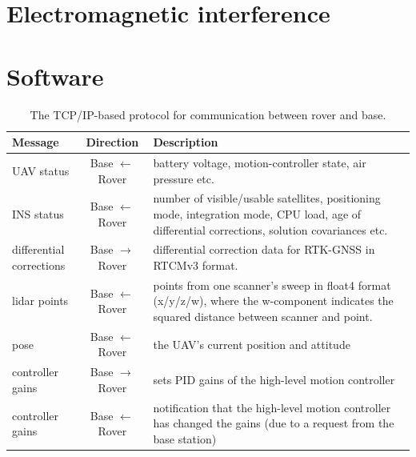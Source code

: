 \section{Electromagnetic interference}
\label{section_experimental_platform_hardware_interference}



\section{Software}
\label{section_experimental_platform_software}

\begin{table}
\caption{The TCP/IP-based protocol for communication between rover and base.}
\label{table_protocol}
\begin{center}
\begin{tabular}{l c l}
  \textbf{Message} & \textbf{Direction} & \textbf{Description} \\ \hline
  \parbox[t]{3cm}{UAV status} & Base $\leftarrow$ Rover & \parbox[t]{9cm}{battery voltage, motion-controller state, air pressure etc.\\} \\
  \parbox[t]{3cm}{INS status} & Base $\leftarrow$ Rover & \parbox[t]{9cm}{number of visible/usable satellites, positioning mode, integration mode, CPU load, age of differential corrections, solution covariances etc.\\} \\
  \parbox[t]{3cm}{differential\\corrections} & Base $\rightarrow$ Rover & \parbox[t]{9cm}{differential correction data for RTK-GNSS in RTCMv3 format.\\} \\
  \parbox[t]{3cm}{lidar points} & Base $\leftarrow$ Rover & \parbox[t]{9cm}{points from one scanner's sweep in float4 format (x/y/z/w), where the w-component indicates the squared distance between scanner and point.\\} \\
  \parbox[t]{3cm}{pose} & Base $\leftarrow$ Rover & \parbox[t]{9cm}{the UAV's current position and attitude\\} \\
  \parbox[t]{3cm}{controller gains} & Base $\rightarrow$ Rover & \parbox[t]{9cm}{sets PID gains of the high-level motion controller\\} \\
  \parbox[t]{3cm}{controller gains} & Base $\leftarrow$ Rover & \parbox[t]{9cm}{notification that the high-level motion controller has changed the gains (due to a request from the base station)\\} \\

\end{tabular}
\end{center}
\end{table}
